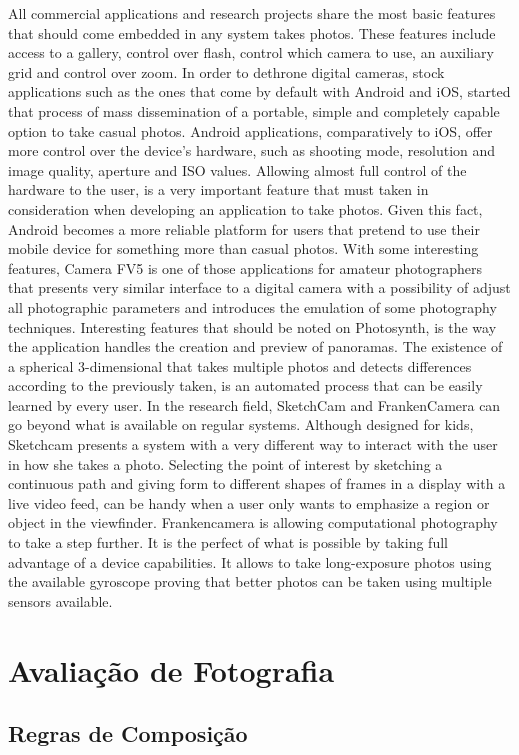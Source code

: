  All commercial applications and research projects share the most basic features that should come embedded in any system takes photos. These features include access to a gallery, control over flash, control which camera to use, an auxiliary grid and control over zoom.
In order to dethrone digital cameras, stock applications such as the ones that come by default with Android and iOS, started that process of mass dissemination of a portable, simple and completely capable option to take casual photos. 
Android applications, comparatively to iOS, offer more control over the device’s hardware, such as shooting mode, resolution and image quality, aperture and ISO values. Allowing almost full control of the hardware to the user, is a very important feature that must taken in consideration when developing an application to take photos. Given this fact, Android becomes a more reliable platform for users that pretend to use their mobile device for something more than casual photos.
With some interesting features, Camera FV5  is one of those applications for amateur photographers that presents very similar interface to a digital camera with a possibility of adjust all photographic parameters and introduces the emulation of some photography techniques.
Interesting features that should be noted on Photosynth, is the way the application handles the creation and preview of panoramas. The existence of a spherical 3-dimensional that takes multiple photos and detects differences according to the previously taken, is an automated process that can be easily learned by every user.
In the research field, SketchCam and FrankenCamera can go beyond what is available on regular systems. Although designed for kids, Sketchcam presents a system with a very different way to interact with the user in how she takes a photo. Selecting the point of interest by sketching a continuous path and giving form to different shapes of frames in a display with a live video feed, can be handy when a user only wants to emphasize a region or object in the viewfinder.
Frankencamera is allowing computational photography to take a step further. It is the perfect of what is possible by taking full advantage of a device capabilities. It allows to take long-exposure photos using the available gyroscope proving that better photos can be taken using multiple sensors available.


\section{Avaliação de Fotografia}
\label{sec:foto_eval}

\subsection{Regras de Composição}
\label{sub:foto_rules}

